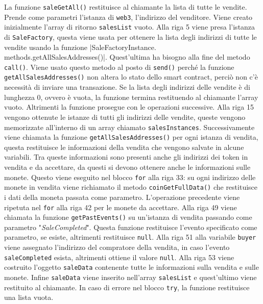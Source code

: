 \documentclass[a4paper]{article}
\begin{document}
        La funzione \verb|saleGetAll()| restituisce al chiamante la lista di tutte le vendite. Prende come parametri l'istanza di \verb|web3|, l'indirizzo del venditore.
        \newline
        Viene creato inizialmente l'array di ritorno \verb|salesList| vuoto.
        Alla riga 5 viene presa l'istanza di \verb|SaleFactory|, questa viene usata per ottenere la lista degli indirizzi di tutte le vendite usando la funzione \spverb|SaleFactoryInstance. methods.getAllSalesAddresses()|.
        Quest'ultima ha bisogno alla fine del metodo \verb|call()|. Viene usato questo metodo al posto di \verb|send()| perché la funzione \verb|getAllSalesAddresses()| non altera lo stato dello smart contract,
        perciò non c'è necessità di inviare una transazione\cite{soliditycall}.
        \newline
        Se la lista degli indirizzi delle vendite è di lunghezza 0, ovvero è vuota, la funzione termina restituendo al chiamante l'array vuoto. Altrimenti la funzione prosegue con le operazioni successive.
        \newline
        Alla riga 15 vengono ottenute le istanze di tutti gli indirizzi delle vendite, queste vengono memorizzate all'interno di un array chiamato \verb|salesInstances|. Successivamente viene chiamata la funzione \verb|getAllSalesAddresses()| per ogni istanza di vendita,
        questa restituisce le informazioni della vendita che vengono salvate in alcune variabili. Tra queste informazioni sono presenti anche gli indirizzi dei token in vendita e da accettare, da questi si devono ottenere anche le informazioni sulle monete.
        Questo viene eseguito nel blocco \verb|for| alla riga 33: su ogni indirizzo delle monete in vendita viene richiamato il metodo \verb|coinGetFullData()| che restituisce i dati della moneta passata come parametro.
        L'operazione precedente viene ripetuta nel \verb|for| alla riga 42 per le monete da accettare.
        Alla riga 49 viene chiamata la funzione \verb|getPastEvents()| su un'istanza di vendita passando come parametro "\emph{SaleCompleted}". Questa funzione restituisce l'evento specificato come parametro, se esiste, altrimenti restituisce \verb|null|.
        Alla riga 51 alla variabile \verb|buyer| viene assegnato l'indirizzo del compratore della vendita, in caso l'evento \verb|saleCompleted| esista, altrimenti ottiene il valore \verb|null|.
        \newline
        Alla riga 53 viene costruito l'oggetto \verb|saleData| contenente tutte le informazioni sulla vendita e sulle monete. Infine \verb|saleData| viene inserito nell'array \verb|salesList| e quest'ultimo viene restituito al chiamante.
        \newline
        In caso di errore nel blocco \verb|try|, la funzione restituisce una lista vuota.
\end{document}
